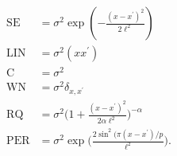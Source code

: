 \begin{align}
\text{SE} &= \sigma^2 \exp(-\frac{(x-x^\prime)^2}{2\ell^2}) \label{eq:SE}\\
\text{LIN} &=   \sigma^2(x x^\prime) \label{eq:LIN}\\
\text{C} &=   \sigma^2\label{eq:C}\\
\text{WN} &= \sigma^2 \delta_{x,x^\prime} \label{eq:WN} \\
\text{RQ} &=    \sigma^2 \bigg(1 + \frac{(x - x^\prime)^2}{2 \alpha \ell^2} \bigg)^{-\alpha} \label{eq:RQ} \\
\text{PER} &=  \sigma^2 \exp \bigg( \frac{2 \sin^2 ( \pi (x - x^\prime)/p}{\ell^2} \bigg). \label{eq:PER}
\end{align}